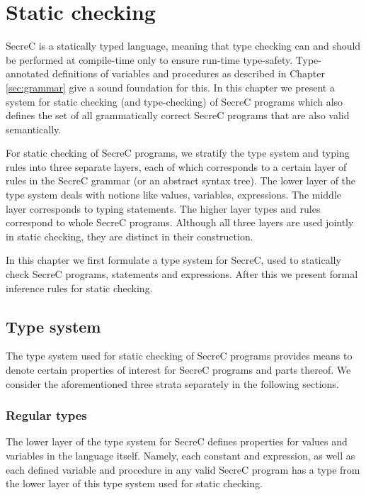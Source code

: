 \documentclass[a4paper, 10pt, draft]{report}
\begin{document}
\chapter{Static checking}\label{sec:checking}

SecreC is a statically typed language, meaning that type checking can and
should be performed at compile-time only to ensure run-time type-safety.
Type-annotated definitions of variables and procedures as described in Chapter
\ref{sec:grammar} give a sound foundation for this. In this chapter we present
a system for static checking (and type-checking) of SecreC programs which also
defines the set of all grammatically correct SecreC programs that are also
valid semantically.

For static checking of SecreC programs, we stratify the type system and typing
rules into three separate layers, each of which corresponds to a certain layer
of rules in the SecreC grammar (or an abstract syntax tree). The lower layer of
the type system deals with notions like values, variables, expressions. The
middle layer corresponds to typing statements. The higher layer types and rules
correspond to whole SecreC programs. Although all three layers are used jointly
in static checking, they are distinct in their construction.

In this chapter we first formulate a type system for SecreC, used to statically
check SecreC programs, statements and expressions. After this we present formal
inference rules for static checking.

\section{Type system}

The type system used for static checking of SecreC programs provides means to
denote certain properties of interest for SecreC programs and parts thereof. We
consider the aforementioned three strata separately in the following sections.

\subsection{Regular types}

The lower layer of the type system for SecreC defines properties for values and
variables in the language itself. Namely, each constant and expression, as well
as each defined variable and procedure in any valid SecreC program has a type
from the lower layer of this type system used for static checking.
\end{document}
